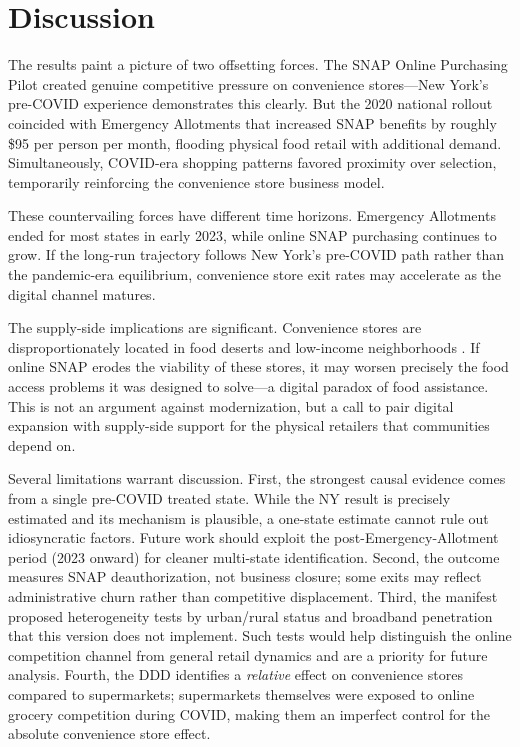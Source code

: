 \documentclass[12pt]{article}
\begin{document}
\section{Discussion}

The results paint a picture of two offsetting forces. The SNAP Online Purchasing Pilot created genuine competitive pressure on convenience stores---New York's pre-COVID experience demonstrates this clearly. But the 2020 national rollout coincided with Emergency Allotments that increased SNAP benefits by roughly \$95 per person per month, flooding physical food retail with additional demand. Simultaneously, COVID-era shopping patterns favored proximity over selection, temporarily reinforcing the convenience store business model.

These countervailing forces have different time horizons. Emergency Allotments ended for most states in early 2023, while online SNAP purchasing continues to grow. If the long-run trajectory follows New York's pre-COVID path rather than the pandemic-era equilibrium, convenience store exit rates may accelerate as the digital channel matures.

The supply-side implications are significant. Convenience stores are disproportionately located in food deserts and low-income neighborhoods \citep{allcott_2019}. If online SNAP erodes the viability of these stores, it may worsen precisely the food access problems it was designed to solve---a digital paradox of food assistance. This is not an argument against modernization, but a call to pair digital expansion with supply-side support for the physical retailers that communities depend on.

Several limitations warrant discussion. First, the strongest causal evidence comes from a single pre-COVID treated state. While the NY result is precisely estimated and its mechanism is plausible, a one-state estimate cannot rule out idiosyncratic factors. Future work should exploit the post-Emergency-Allotment period (2023 onward) for cleaner multi-state identification. Second, the outcome measures SNAP deauthorization, not business closure; some exits may reflect administrative churn rather than competitive displacement. Third, the manifest proposed heterogeneity tests by urban/rural status and broadband penetration that this version does not implement. Such tests would help distinguish the online competition channel from general retail dynamics and are a priority for future analysis. Fourth, the DDD identifies a \emph{relative} effect on convenience stores compared to supermarkets; supermarkets themselves were exposed to online grocery competition during COVID, making them an imperfect control for the absolute convenience store effect.
\end{document}
